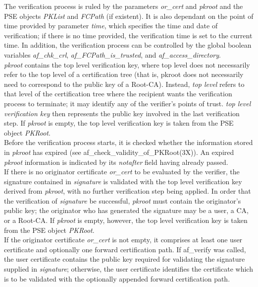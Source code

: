 The verification process is ruled by the parameters
{\em or\_cert} and {\em pkroot} and the PSE objects {\em PKList} and {\em FCPath} (if
existent). It is also dependant on the point of time provided by parameter {\em time}, which
specifies the time and date of verification; if there
is no time provided, the verification time is set to the current time.
In addition, the verification process can be controlled by the global boolean variables
{\em af\_chk\_crl}, {\em af\_FCPath\_is\_trusted}, and {\em af\_access\_directory}.
\\ [1em]
{\em pkroot} contains the top level verification key, where top 
level does not necessarily refer to the top level of a certification tree 
(that is, pkroot does not necessarily need to correspond to the
public key of a Root-CA). Instead, {\em top level} refers to that level 
of the certification tree where the recipient wants the verification 
process to terminate; it may identify any of the verifier's points of trust.
{\em top level verification key} then represents the 
public key involved in the last verification step.
If {\em pkroot} is empty, the top level verification key is 
taken from the PSE object {\em PKRoot}.
\\ [1em]
Before the verification process starts, it is checked whether the information stored
in {\em pkroot} has expired (see af\_check\_validity\_of\_PKRoot(3X)). An expired
{\em pkroot} information is indicated by its {\em notafter} field having already
passed.
\\ [1em]
If there is no originator certificate {\em or\_cert} to be evaluated 
by the verifier, the signature contained in {\em signature} is 
validated with the top level verification key derived from {\em pkroot}, 
with no further verification step being applied. In order that the 
verification of {\em signature} be successful, {\em pkroot} must contain the 
originator's public key; the originator who has 
generated the signature may be a user, a CA, or a Root-CA.
If {\em pkroot} is empty, however, the top level verification key is 
taken from the PSE object {\em PKRoot}.
\\ [1em]
If the originator certificate {\em or\_cert} is not empty, it
comprises at least one user certificate and optionally one
forward certification path. If af\_verify was called, the user certificate 
contains the public key required for validating the signature supplied in 
{\em signature}; otherwise, the user certificate identifies the
certificate which is to be validated with the optionally appended
forward certification path.
